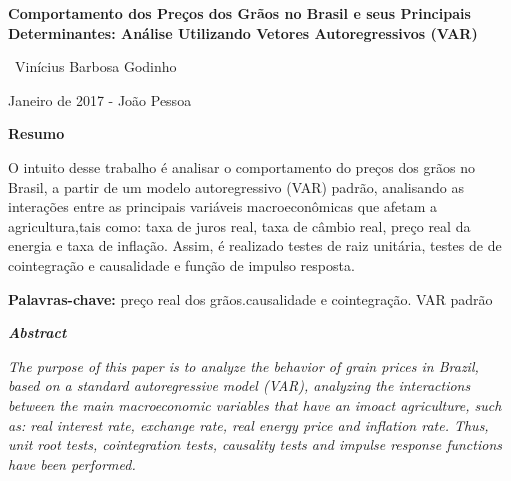 \documentclass[a4paper,12pt,oneside,titlepage]{article}
\begin{document}
\begin{center}
\textbf{\LARGE{Comportamento dos Preços dos Grãos no Brasil e seus Principais Determinantes: Análise Utilizando Vetores Autoregressivos (VAR)}}	
\end{center}	

\vspace{3pt}

\begin{center}
\ Vinícius Barbosa Godinho

\vspace{3pt}

Janeiro de 2017 - João Pessoa
\end{center}
\vspace{6pt}
\begin{center}
	
\textbf{Resumo}
\end{center}
\vspace{6pt}
\noindent O intuito desse trabalho é analisar o comportamento do preços dos grãos no Brasil, a partir de um modelo autoregressivo (VAR) padrão, analisando as interações entre as principais variáveis macroeconômicas que afetam a agricultura,tais como: taxa de juros real, taxa de câmbio real, preço real da energia e taxa de inflação. Assim, é realizado testes de raiz unitária, testes de de cointegração e causalidade e função de impulso resposta.   


\vspace{12 pt} 

	\noindent
\textbf{Palavras-chave:} preço real dos grãos.causalidade e cointegração. VAR padrão



\vspace{6pt}
\begin{center}
\textbf{\textit{Abstract}}	
\end{center}


\vspace{6pt}	
	\noindent 	\textit{The purpose of this paper is to analyze the behavior of grain prices in Brazil, based on a standard autoregressive model (VAR), analyzing the interactions between the main macroeconomic variables that have an imoact agriculture, such as: real interest rate, exchange rate, real energy price and inflation rate. Thus, unit root tests, cointegration tests, causality tests and impulse response functions have been performed.}
	
\end{document}
